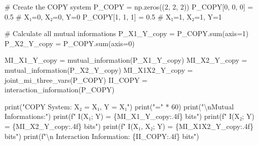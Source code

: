 \documentclass[
  11pt,
  letterpaper,
  oneside,
  openany]{book}
\newenvironment{Shaded}{\begin{snugshade}}{\end{snugshade}}
\newcommand{\BuiltInTok}[1]{\textcolor[rgb]{0.00,0.23,0.31}{#1}}
\newcommand{\CharTok}[1]{\textcolor[rgb]{0.13,0.47,0.30}{#1}}
\newcommand{\CommentTok}[1]{\textcolor[rgb]{0.37,0.37,0.37}{#1}}
\newcommand{\DecValTok}[1]{\textcolor[rgb]{0.68,0.00,0.00}{#1}}
\newcommand{\FloatTok}[1]{\textcolor[rgb]{0.68,0.00,0.00}{#1}}
\newcommand{\NormalTok}[1]{\textcolor[rgb]{0.00,0.23,0.31}{#1}}
\newcommand{\OperatorTok}[1]{\textcolor[rgb]{0.37,0.37,0.37}{#1}}
\newcommand{\SpecialCharTok}[1]{\textcolor[rgb]{0.37,0.37,0.37}{#1}}
\newcommand{\SpecialStringTok}[1]{\textcolor[rgb]{0.13,0.47,0.30}{#1}}
\newcommand{\StringTok}[1]{\textcolor[rgb]{0.13,0.47,0.30}{#1}}
\begin{document}
\begin{Shaded}
\begin{Highlighting}[]
\CommentTok{\# Create the COPY system}
\NormalTok{P\_COPY }\OperatorTok{=}\NormalTok{ np.zeros((}\DecValTok{2}\NormalTok{, }\DecValTok{2}\NormalTok{, }\DecValTok{2}\NormalTok{))}
\NormalTok{P\_COPY[}\DecValTok{0}\NormalTok{, }\DecValTok{0}\NormalTok{, }\DecValTok{0}\NormalTok{] }\OperatorTok{=} \FloatTok{0.5}  \CommentTok{\# X₁=0, X₂=0, Y=0}
\NormalTok{P\_COPY[}\DecValTok{1}\NormalTok{, }\DecValTok{1}\NormalTok{, }\DecValTok{1}\NormalTok{] }\OperatorTok{=} \FloatTok{0.5}  \CommentTok{\# X₁=1, X₂=1, Y=1}

\CommentTok{\# Calculate all mutual informations}
\NormalTok{P\_X1\_Y\_copy }\OperatorTok{=}\NormalTok{ P\_COPY.}\BuiltInTok{sum}\NormalTok{(axis}\OperatorTok{=}\DecValTok{1}\NormalTok{)}
\NormalTok{P\_X2\_Y\_copy }\OperatorTok{=}\NormalTok{ P\_COPY.}\BuiltInTok{sum}\NormalTok{(axis}\OperatorTok{=}\DecValTok{0}\NormalTok{)}

\NormalTok{MI\_X1\_Y\_copy }\OperatorTok{=}\NormalTok{ mutual\_information(P\_X1\_Y\_copy)}
\NormalTok{MI\_X2\_Y\_copy }\OperatorTok{=}\NormalTok{ mutual\_information(P\_X2\_Y\_copy)}
\NormalTok{MI\_X1X2\_Y\_copy }\OperatorTok{=}\NormalTok{ joint\_mi\_three\_vars(P\_COPY)}
\NormalTok{II\_COPY }\OperatorTok{=}\NormalTok{ interaction\_information(P\_COPY)}

\BuiltInTok{print}\NormalTok{(}\StringTok{"COPY System: X₂ = X₁, Y = X₁"}\NormalTok{)}
\BuiltInTok{print}\NormalTok{(}\StringTok{"="} \OperatorTok{*} \DecValTok{60}\NormalTok{)}
\BuiltInTok{print}\NormalTok{(}\StringTok{"}\CharTok{\textbackslash{}n}\StringTok{Mutual Informations:"}\NormalTok{)}
\BuiltInTok{print}\NormalTok{(}\SpecialStringTok{f"  I(X₁; Y) = }\SpecialCharTok{\{}\NormalTok{MI\_X1\_Y\_copy}\SpecialCharTok{:.4f\}}\SpecialStringTok{ bits"}\NormalTok{)}
\BuiltInTok{print}\NormalTok{(}\SpecialStringTok{f"  I(X₂; Y) = }\SpecialCharTok{\{}\NormalTok{MI\_X2\_Y\_copy}\SpecialCharTok{:.4f\}}\SpecialStringTok{ bits"}\NormalTok{)}
\BuiltInTok{print}\NormalTok{(}\SpecialStringTok{f"  I(X₁, X₂; Y) = }\SpecialCharTok{\{}\NormalTok{MI\_X1X2\_Y\_copy}\SpecialCharTok{:.4f\}}\SpecialStringTok{ bits"}\NormalTok{)}
\BuiltInTok{print}\NormalTok{(}\SpecialStringTok{f"}\CharTok{\textbackslash{}n}\SpecialStringTok{  Interaction Information: }\SpecialCharTok{\{}\NormalTok{II\_COPY}\SpecialCharTok{:.4f\}}\SpecialStringTok{ bits"}\NormalTok{)}


\end{Highlighting}
\end{Shaded}
\end{document}
